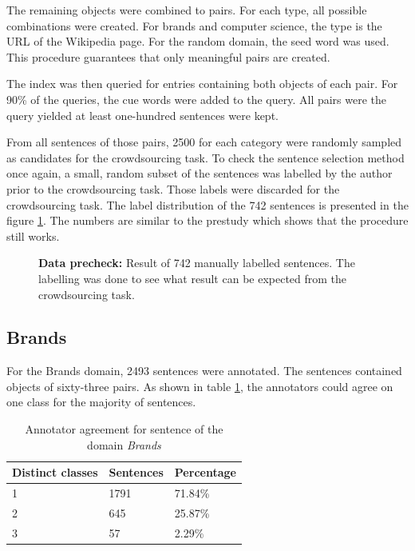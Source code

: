 The remaining objects were combined to pairs. For each type, all possible combinations were created. For brands and computer science, the type is the URL of the Wikipedia page. For the random domain, the seed word was used. This procedure guarantees that only meaningful pairs are created.




The index was then queried for entries containing both objects of each pair. For 90\% of the queries, the cue words were added to the query. All pairs were the query yielded at least one-hundred sentences were kept.

From all sentences of those pairs, 2500 for each category were randomly sampled as candidates for the crowdsourcing task. To check the sentence selection method once again, a small, random subset of the sentences was labelled by the author prior to the crowdsourcing task. Those labels were discarded for the crowdsourcing task.
The label distribution of the 742 sentences is presented in the figure \ref{fig:sample}. The numbers are similar to the prestudy which shows that the procedure still works.


\begin{figure}[h]
\centering
\caption{\textbf{Data precheck:} Result of 742 manually labelled sentences. The labelling was done to see what result can be expected from the crowdsourcing task.}
\label{fig:sample}
\end{figure}

\subsection{Brands}
\label{sec:brands}
For the Brands domain, 2493 sentences were annotated. The sentences contained objects of sixty-three pairs. As shown in table \ref{fig:brand_agg}, the annotators could agree on one class for the majority of sentences.

\begin{table}[h]
\caption{Annotator agreement for sentence of the domain \emph{Brands}}
\label{fig:brand_agg}
\begin{tabularx}{\textwidth}{XXX}
\toprule
Distinct classes & Sentences & Percentage \\
\midrule
1 & 1791 & 71.84\%\\
2 & 645 & 25.87\%\\
3 & 57 & 2.29\%\\
\bottomrule
\end{tabularx}
\end{table}



